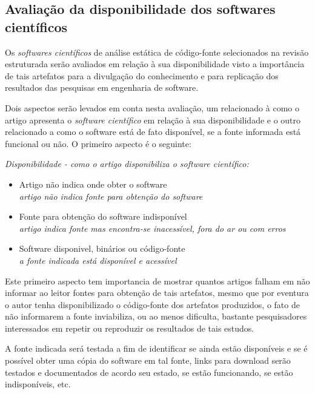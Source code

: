 \subsection{Avaliação da disponibilidade dos softwares científicos}

Os {\it softwares científicos} de análise estática de código-fonte selecionados
na revisão estruturada serão avaliados em relação à sua disponibilidade visto a
importância de tais artefatos para a divulgação do conhecimento e para
replicação dos resultados das pesquisas em engenharia de software.

Dois aspectos serão levados em conta nesta avaliação, um relacionado à como o
artigo apresenta o {\it software científico} em relação à sua disponibilidade e
o outro relacionado a como o software está de fato disponível, se a fonte
informada está funcional ou não. O primeiro aspecto é o seguinte:

\begin{description}

  \item {\it Disponibilidade - como o artigo disponibiliza o software científico:}
    \begin{itemize}
      \item Artigo não indica onde obter o software\\
        {\it \small artigo não indica fonte para obtenção do software}
      \item Fonte para obtenção do software indisponível\\
        {\it \small artigo indica fonte mas encontra-se inacessível, fora do ar ou com erros}
      \item Software disponivel, binários ou código-fonte\\
        {\it \small a fonte indicada está disponível e acessível}
    \end{itemize}

\end{description}

Este primeiro aspecto tem importancia de mostrar quantos artigos falham em
não informar ao leitor fontes para obtenção de tais artefatos, mesmo que por
eventura o autor tenha disponibilizado o código-fonte dos artefatos produzidos,
o fato de não informarem a fonte inviabiliza, ou ao menos dificulta, bastante
pesquisadores interessados em repetir ou reproduzir os resultados de tais estudos.

A fonte indicada será testada a fim de identificar se ainda estão disponíveis e
se é possível obter uma cópia do software em tal fonte, links para download
serão testados e documentados de acordo seu estado, se estão funcionando, se
estão indisponíveis, etc.

